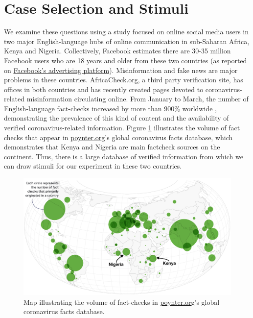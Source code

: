\documentclass[letterpaper, 12pt, parskip=full,]{scrartcl}
\begin{document}
\section{Case Selection and Stimuli}

We examine these questions using a study focused on online social media users in two major English-language hubs of online communication in sub-Saharan Africa, Kenya and Nigeria.  Collectively, Facebook estimates there are 30-35 million Facebook users who are 18 years and older from these two countries (as reported on \href{https://www.facebook.com/business/insights/tools/audience-insights?ref=ens_rdr}{Facebook's advertising platform}). Misinformation and fake news are major problems in these countries. AfricaCheck.org, a third party verification site, has offices in both countries and has recently created pages devoted to coronavirus-related misinformation circulating online. From January to March, the number of English-language fact-checks increased by more than 900\% worldwide \citep{brennen2020types}, demonstrating the prevalence of this kind of content and the availability of verified coronavirus-related information.  Figure \ref{fig:poynter} illustrates the volume of fact checks that appear in \url{poynter.org}'s global coronavirus facts database, which demonstrates that Kenya and Nigeria are main factcheck sources on the continent. Thus, there is a large database of verified information from which we can draw stimuli for our experiment in these two countries. 

\begin{figure}[!htb]
\centering
\caption{Map illustrating the volume of fact-checks in \url{poynter.org}'s global coronavirus facts database.}
\label{fig:poynter}
\includegraphics[width=.95\textwidth]{poynter2.png}
\end{figure}
\end{document}
